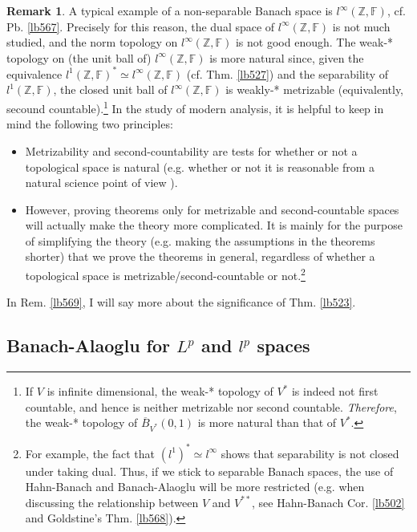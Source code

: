 \documentclass[12pt,b5paper,notitlepage]{article}
\theoremstyle{definition}
\newtheorem{rem}[df]{Remark}
\theoremstyle{plain}
\newcommand{\ovl}{\overline}
\newcommand{\Zbb}{\mathbb Z}
\newcommand{\Fbb}{\mathbb F}
\numberwithin{equation}{section}
\begin{document}
\begin{rem}
A typical example of a non-separable Banach space is $l^\infty(\Zbb,\Fbb)$, cf. Pb. \ref{lb567}. Precisely for this reason, the dual space of $l^\infty(\Zbb,\Fbb)$ is not much studied, and the norm topology on $l^\infty(\Zbb,\Fbb)$ is not good enough. The weak-* topology on (the unit ball of) $l^\infty(\Zbb,\Fbb)$ is more natural since, given the equivalence $l^1(\Zbb,\Fbb)^*\simeq l^\infty(\Zbb,\Fbb)$ (cf. Thm. \ref{lb527}) and the separability of $l^1(\Zbb,\Fbb)$, the closed unit ball of $l^\infty(\Zbb,\Fbb)$ is weakly-* metrizable (equivalently, secound countable).\footnote{If $V$ is infinite dimensional, the weak-* topology of $V^*$ is indeed not first countable, and hence is neither metrizable nor second countable. \textit{Therefore}, the weak-* topology of $\ovl B_{V^*}(0,1)$ is more natural than that of $V^*$.} In the study of modern analysis, it is helpful to keep in mind the following two principles:
\begin{itemize}
\item Metrizability and second-countability are tests for whether or not a topological space is natural (e.g. whether or not it is reasonable from a natural science point of view%
).
\item However, proving theorems only for metrizable and second-countable spaces will actually make the theory more complicated. It is mainly for the purpose of simplifying the theory (e.g. making the assumptions in the theorems shorter) that we prove the theorems in general, regardless of whether a topological space is metrizable/second-countable or not.\footnote{For example, the fact that $(l^1)^*\simeq l^\infty$ shows that separability is not closed under taking dual. Thus, if we stick to separable Banach spaces, the use of Hahn-Banach and Banach-Alaoglu will be more restricted (e.g. when discussing the relationship between $V$ and $V^{**}$, see Hahn-Banach Cor. \ref{lb502} and Goldstine's Thm. \ref{lb568}).}
\end{itemize}
In Rem. \ref{lb569}, I will say more about the significance of Thm. \ref{lb523}.
\end{rem}




\subsection{Banach-Alaoglu for $L^p$ and $l^p$ spaces}
\end{document}
